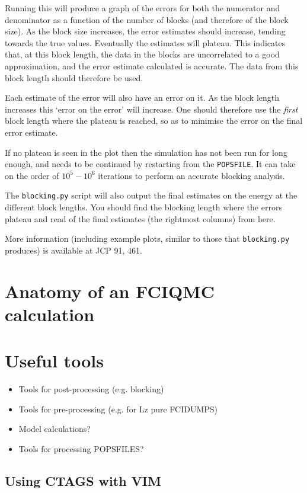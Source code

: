 \documentclass[a4paper,notitlepage]{scrreprt}
\let\code\lstinline
\begin{document}
    Running this will produce a graph of the errors for both the numerator and
    denominator as a function of the number of blocks (and therefore of the
    block size). As the block size increases, the error estimates should
    increase, tending towards the true values. Eventually the estimates will
    plateau. This indicates that, at this block length, the data in the blocks
    are uncorrelated to a good approximation, and the error estimate calculated
    is accurate. The data from this block length should therefore be used.

    Each estimate of the error will also have an error on it. As the block
    length increases this `error on the error' will increase. One should
    therefore use the \emph{first} block length where the plateau is reached,
    so as to minimise the error on the final error estimate.

    If no plateau is seen in the plot then the simulation has not been run for
	long enough, and needs to be continued by restarting from the \code{POPSFILE}.
    It can take on the order of $10^5-10^6$ iterations to perform an accurate
    blocking analysis.

	The \code{blocking.py} script will also output the final estimates on the energy
    at the different block lengths. You should find the blocking length where
    the errors plateau and read of the final estimates (the rightmost columns)
    from here.

	More information (including example plots, similar to those that
	\code{blocking.py} produces) is available at JCP 91, 461.

\section{Anatomy of an FCIQMC calculation}
\section{Useful tools}
\begin{itemize}
	\item Tools for post-processing (e.g. blocking)
	\item Tools for pre-processing (e.g. for Lz pure FCIDUMPS)
	\item Model calculations?
	\item Tools for processing POPSFILES?
\end{itemize}
\subsection{Using CTAGS with VIM}
\end{document}
